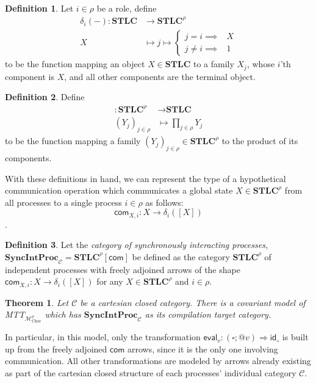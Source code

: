 \documentclass{scrartcl}
\theoremstyle{definition}
\newtheorem{definition}{Definition}
\theoremstyle{plain}
\newtheorem{theorem}{Theorem}
\begin{document}
\begin{definition}
  Let $i\in\rho$ be a role, define
  \begin{align*}
    \delta_i({-}) : \textbf{STLC} &\to \textbf{STLC}^\rho \\
    X &\mapsto j \mapsto \begin{cases}j = i \implies &X\\j \neq i \implies &1 \end{cases}
  \end{align*}
  to be the function mapping an object $X \in \textbf{STLC}$ to a family
  $X_j$, whose $i$'th component is $X$, and all other components are the
  terminal object.
\end{definition}

\begin{definition} Define
  \begin{align*}
    [{-}] : \textbf{STLC}^\rho &\to \textbf{STLC} \\
    (Y_j)_{j\in\rho} &\mapsto \prod_{j \in \rho} Y_j
  \end{align*}
  to be the function mapping a family $(Y_j)_{j\in\rho} \in \textbf{STLC}^\rho$
  to the product of its components.
\end{definition}

With these definitions in hand, we can represent the type of a hypothetical
communication operation which communicates a global state $X \in
\textbf{STLC}^\rho$ from all processes to a single process $i \in \rho$ as follows:
\[
  \textsf{com}_{X,i} : X \to \delta_i([X])
\].

\begin{definition}
  Let the \textit{category of synchronously interacting processes},
  $\textbf{SyncIntProc}_{\mathcal{C}} = \textbf{STLC}^\rho[\textsf{com}]$
  be defined as the category
  $\textbf{STLC}^\rho$ of independent processes with freely adjoined arrows of
  the shape $\textsf{com}_{X,i} : X \to \delta_i([X])$ for any $X \in
  \textbf{STLC}^\rho$ and $i \in \rho$.
\end{definition}

\begin{theorem}
  Let $\mathcal{C}$ be a cartesian closed category. There is a covariant model
  of MTT${}_{\mathcal{M}^\rho_{\textrm{Chor}}}$ which has
  $\textbf{SyncIntProc}_{\mathcal{C}}$ as its compilation target category.
\end{theorem}

In particular, in this model, only the transformation $\textsf{eval}_v : (\square ;
{}@ v) \Rightarrow \textsf{id}_\circ$ is built up from the freely adjoined
$\textsf{com}$ arrows, since it is the only one involving communication. All
other transformations are modeled by arrows already existing as part of the
cartesian closed structure of each processes' individual category $\mathcal{C}$.
\end{document}
